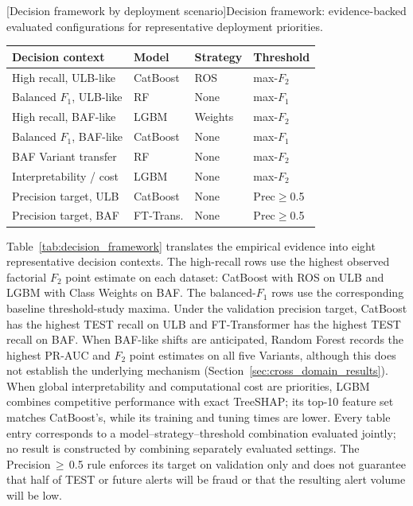 \noindent\begin{minipage}{\linewidth}\centering
{}[Decision framework by deployment scenario]{Decision framework: evidence-backed evaluated configurations for representative deployment priorities.}
\label{tab:decision_framework}
\begin{tabular}{p{4.2cm} l l l}
\toprule
Decision context & Model & Strategy & Threshold \\
\midrule
High recall, ULB-like      & CatBoost  & ROS          & max-$F_2$      \\
Balanced $F_1$, ULB-like   & RF        & None         & max-$F_1$      \\
High recall, BAF-like      & LGBM      & Weights      & max-$F_2$      \\
Balanced $F_1$, BAF-like   & CatBoost  & None         & max-$F_1$      \\
BAF Variant transfer       & RF        & None         & max-$F_2$      \\
Interpretability / cost    & LGBM      & None         & max-$F_2$      \\
Precision target, ULB      & CatBoost  & None         & Prec$\geq$0.5  \\
Precision target, BAF      & FT-Trans. & None         & Prec$\geq$0.5  \\
\bottomrule
\end{tabular}
\end{minipage}

Table~\ref{tab:decision_framework} translates the empirical evidence into eight representative decision contexts. The high-recall rows use the highest observed factorial $F_2$ point estimate on each dataset: CatBoost with ROS on ULB and LGBM with Class Weights on BAF. The balanced-$F_1$ rows use the corresponding baseline threshold-study maxima. Under the validation precision target, CatBoost has the highest TEST recall on ULB and FT-Transformer has the highest TEST recall on BAF. When BAF-like shifts are anticipated, Random Forest records the highest PR-AUC and $F_2$ point estimates on all five Variants, although this does not establish the underlying mechanism (Section~\ref{sec:cross_domain_results}). When global interpretability and computational cost are priorities, LGBM combines competitive performance with exact TreeSHAP; its top-10 feature set matches CatBoost's, while its training and tuning times are lower. Every table entry corresponds to a model--strategy--threshold combination evaluated jointly; no result is constructed by combining separately evaluated settings. The Precision\,$\geq$\,0.5 rule enforces its target on validation only and does not guarantee that half of TEST or future alerts will be fraud or that the resulting alert volume will be low.


